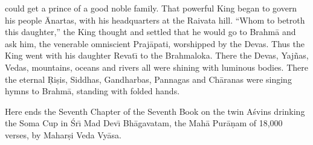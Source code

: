 could get a prince of a good noble family. That powerful King began to govern his people \=Anartas, with his headquarters at the Raivata hill. ``Whom to betroth this daughter,'' the King thought and settled that he would go to Brahm\=a and ask him, the venerable omniscient Praj\=apati, worshipped by the Devas. Thus the King went with his daughter Revat\={\i} to the Brahmaloka. There the Devas, Yaj\~nas, Vedas, mountains, oceans and rivers all were shining with luminous bodies. There the eternal \d{R}i\d{s}is, Siddhas, Gandharbas, Pannagas and Ch\=aranas were singing hymns to Brahm\=a, standing with folded hands.

Here ends the Seventh Chapter of the Seventh Book on the twin A\'svins drinking the Soma Cup in \'Sr\={\i} Mad Dev\={\i} Bh\=agavatam, the Mah\=a Pur\=a\d{n}am of 18,000 verses, by Mahar\d{s}i Veda Vy\=asa.



